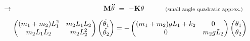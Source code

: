 \documentclass[12pt]{article}
\begin{document}
\vspace{15pt}\noindent
\(\rightarrow \begin{aligned}[t]
    \mathbf{M\ddot{\theta}} &\ = \ -\mathbf{K\theta} \indent\indent \text{\scriptsize(small angle quadratic approx.)}\\[5pt]
    \left(\begin{matrix}
        (m_1+m_2)L_1^2 & m_2 L_1 L_2 \\
        m_2 L_1 L_2 & m_2 L_2^2
    \end{matrix}\right)
    \left(\begin{matrix}
        \ddot{\theta_1}\\
        \ddot{\theta_2}
    \end{matrix}\right) &= 
        -\left(\begin{matrix}
            (m_1+m_2) g L_1 + k_2 & 0\\
            0 & m_2 g L_2
        \end{matrix}\right)
        \left(\begin{matrix}
            \theta_1\\
            \theta_2
        \end{matrix}\right)
\end{aligned}\)
\end{document}
